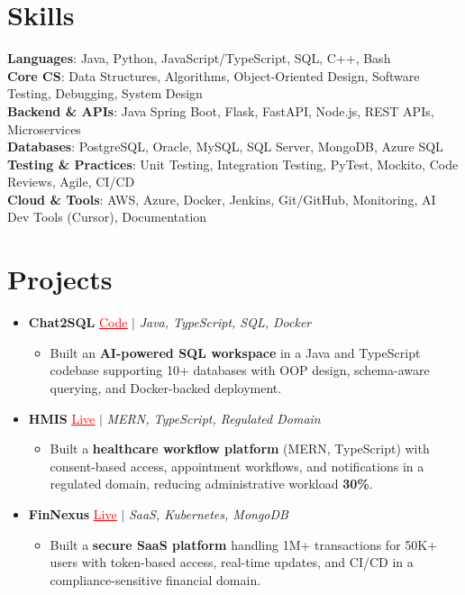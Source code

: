 \documentclass[letterpaper,10pt]{article}
\newcommand{\resumeItem}[1]{\item\small{{#1 \vspace{-2pt}}}}
\newcommand{\resumeProjectHeading}[1]{\item \small #1 \vspace{-2pt}}
\newcommand{\resumeSubHeadingListStart}{\begin{itemize}[leftmargin=0.0in, label={}]}
\newcommand{\resumeSubHeadingListEnd}{\end{itemize}}
\newcommand{\resumeProjItemListStart}{\begin{itemize}[leftmargin=0.15in,label=\textbullet,itemsep=0pt,topsep=0pt,parsep=0pt,partopsep=0pt]}
\newcommand{\resumeProjItemListEnd}{\end{itemize}\vspace{-4pt}}
\begin{document}
\section{Skills}
\begin{itemize}[leftmargin=0.15in, label={}]
\small{\item{
\textbf{Languages}: Java, Python, JavaScript/TypeScript, SQL, C++, Bash \\
\textbf{Core CS}: Data Structures, Algorithms, Object-Oriented Design, Software Testing, Debugging, System Design \\
\textbf{Backend \& APIs}: Java Spring Boot, Flask, FastAPI, Node.js, REST APIs, Microservices \\
\textbf{Databases}: PostgreSQL, Oracle, MySQL, SQL Server, MongoDB, Azure SQL \\
\textbf{Testing \& Practices}: Unit Testing, Integration Testing, PyTest, Mockito, Code Reviews, Agile, CI/CD \\
\textbf{Cloud \& Tools}: AWS, Azure, Docker, Jenkins, Git/GitHub, Monitoring, AI Dev Tools (Cursor), Documentation
}}
\end{itemize}
\vspace{-6pt}
\section{Projects}
\resumeSubHeadingListStart
\vspace{-2pt}
\resumeProjectHeading{\textbf{Chat2SQL} {\href{https://github.com/SAHAJ-BHADJA/Chat2SQL}{\textcolor{red}{\underline{Code}}}} $|$ \emph{Java, TypeScript, SQL, Docker}}
\resumeProjItemListStart
\resumeItem{Built an \textbf{AI-powered SQL workspace} in a Java and TypeScript codebase supporting 10+ databases with OOP design, schema-aware querying, and Docker-backed deployment.}
\resumeProjItemListEnd
\vspace{3pt}
\resumeProjectHeading{\textbf{HMIS} {\href{https://hims-rouge.vercel.app/}{\textcolor{red}{\underline{Live}}}} $|$ \emph{MERN, TypeScript, Regulated Domain}}
\resumeProjItemListStart
\resumeItem{Built a \textbf{healthcare workflow platform} (MERN, TypeScript) with consent-based access, appointment workflows, and notifications in a regulated domain, reducing administrative workload \textbf{30\%}.}
\resumeProjItemListEnd
\vspace{3pt}
\resumeProjectHeading{\textbf{FinNexus} {\href{https://fin-nexus.vercel.app/}{\textcolor{red}{\underline{Live}}}} $|$ \emph{SaaS, Kubernetes, MongoDB}}
\resumeProjItemListStart
\resumeItem{Built a \textbf{secure SaaS platform} handling 1M+ transactions for 50K+ users with token-based access, real-time updates, and CI/CD in a compliance-sensitive financial domain.}
\resumeProjItemListEnd
\resumeSubHeadingListEnd
\end{document}
